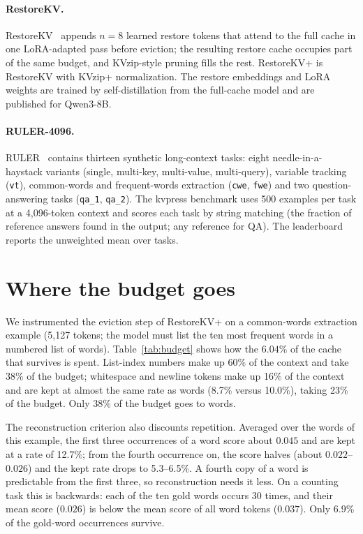 \documentclass[11pt]{article}
\begin{document}
\paragraph{RestoreKV.} RestoreKV~\cite{baek2026restorekv} appends $n=8$ learned restore tokens that attend to the full cache in
one LoRA-adapted pass before eviction; the resulting restore cache occupies part of the same budget, and KVzip-style pruning fills
the rest. RestoreKV+ is RestoreKV with KVzip+ normalization. The restore embeddings and LoRA weights are trained by
self-distillation from the full-cache model and are published for Qwen3-8B.

\paragraph{RULER-4096.} RULER~\cite{hsieh2024ruler} contains thirteen synthetic long-context tasks: eight needle-in-a-haystack
variants (single, multi-key, multi-value, multi-query), variable tracking (\texttt{vt}), common-words and frequent-words extraction
(\texttt{cwe}, \texttt{fwe}) and two question-answering tasks (\texttt{qa\_1}, \texttt{qa\_2}). The kvpress benchmark uses 500
examples per task at a 4{,}096-token context and scores each task by string matching (the fraction of reference answers found in
the output; any reference for QA). The leaderboard reports the unweighted mean over tasks.

\section{Where the budget goes}
\label{sec:diagnosis}
We instrumented the eviction step of RestoreKV+ on a common-words extraction example (5{,}127 tokens; the model must list the ten
most frequent words in a numbered list of words). Table~\ref{tab:budget} shows how the $6.04\%$ of the cache that survives is
spent. List-index numbers make up 60\% of the context and take 38\% of the budget; whitespace and newline tokens make up 16\% of
the context and are kept at almost the same rate as words (8.7\% versus 10.0\%), taking 23\% of the budget. Only 38\% of the budget
goes to words.

The reconstruction criterion also discounts repetition. Averaged over the words of this example, the first three occurrences of a
word score about $0.045$ and are kept at a rate of 12.7\%; from the fourth occurrence on, the score halves (about $0.022$--$0.026$)
and the kept rate drops to 5.3--6.5\%. A fourth copy of a word is predictable from the first three, so reconstruction needs it less.
On a counting task this is backwards: each of the ten gold words occurs 30 times, and their mean score ($0.026$) is below the mean
score of all word tokens ($0.037$). Only 6.9\% of the gold-word occurrences survive.
\end{document}
